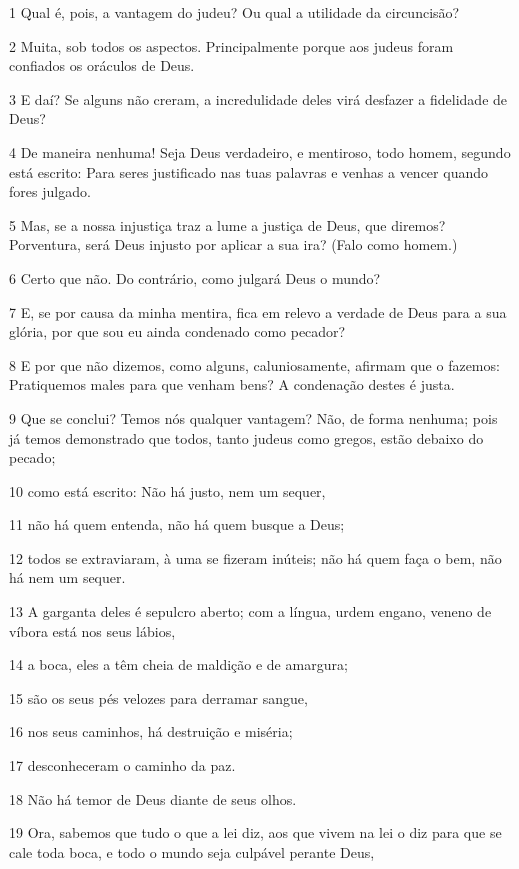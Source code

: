 \par 1 Qual é, pois, a vantagem do judeu? Ou qual a utilidade da circuncisão?
\par 2 Muita, sob todos os aspectos. Principalmente porque aos judeus foram confiados os oráculos de Deus.
\par 3 E daí? Se alguns não creram, a incredulidade deles virá desfazer a fidelidade de Deus?
\par 4 De maneira nenhuma! Seja Deus verdadeiro, e mentiroso, todo homem, segundo está escrito: Para seres justificado nas tuas palavras e venhas a vencer quando fores julgado.
\par 5 Mas, se a nossa injustiça traz a lume a justiça de Deus, que diremos? Porventura, será Deus injusto por aplicar a sua ira? (Falo como homem.)
\par 6 Certo que não. Do contrário, como julgará Deus o mundo?
\par 7 E, se por causa da minha mentira, fica em relevo a verdade de Deus para a sua glória, por que sou eu ainda condenado como pecador?
\par 8 E por que não dizemos, como alguns, caluniosamente, afirmam que o fazemos: Pratiquemos males para que venham bens? A condenação destes é justa.
\par 9 Que se conclui? Temos nós qualquer vantagem? Não, de forma nenhuma; pois já temos demonstrado que todos, tanto judeus como gregos, estão debaixo do pecado;
\par 10 como está escrito: Não há justo, nem um sequer,
\par 11 não há quem entenda, não há quem busque a Deus;
\par 12 todos se extraviaram, à uma se fizeram inúteis; não há quem faça o bem, não há nem um sequer.
\par 13 A garganta deles é sepulcro aberto; com a língua, urdem engano, veneno de víbora está nos seus lábios,
\par 14 a boca, eles a têm cheia de maldição e de amargura;
\par 15 são os seus pés velozes para derramar sangue,
\par 16 nos seus caminhos, há destruição e miséria;
\par 17 desconheceram o caminho da paz.
\par 18 Não há temor de Deus diante de seus olhos.
\par 19 Ora, sabemos que tudo o que a lei diz, aos que vivem na lei o diz para que se cale toda boca, e todo o mundo seja culpável perante Deus,

